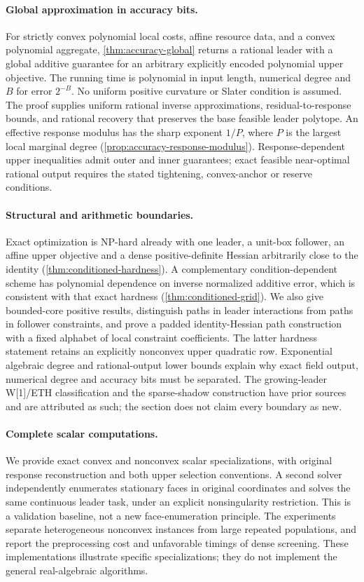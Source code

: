 \paragraph{Global approximation in accuracy bits.}
For strictly convex polynomial local costs, affine resource data, and a convex
polynomial aggregate, \cref{thm:accuracy-global} returns a rational leader
with a global additive guarantee for an arbitrary explicitly encoded polynomial
upper objective. The running time is polynomial in input length, numerical
degree and $B$ for error $2^{-B}$. No uniform positive curvature or Slater
condition is assumed. The proof supplies uniform rational inverse
approximations, residual-to-response bounds, and rational recovery that
preserves the base feasible leader polytope. An effective response modulus has
the sharp exponent $1/P$, where $P$ is the largest local marginal degree
(\cref{prop:accuracy-response-modulus}). Response-dependent upper inequalities
admit outer and inner guarantees; exact feasible near-optimal rational output
requires the stated tightening, convex-anchor or reserve conditions.

\paragraph{Structural and arithmetic boundaries.}
Exact optimization is NP-hard already with one leader, a unit-box follower,
an affine upper objective and a dense positive-definite Hessian arbitrarily
close to the identity (\cref{thm:conditioned-hardness}). A complementary
condition-dependent scheme has polynomial dependence on inverse normalized
additive error, which is consistent with that exact hardness
(\cref{thm:conditioned-grid}). We also give bounded-core positive results,
distinguish paths in leader interactions from paths in follower constraints,
and prove a padded identity-Hessian path construction with a fixed alphabet
of local constraint coefficients. The latter hardness statement retains an
explicitly nonconvex upper quadratic row. Exponential algebraic degree and
rational-output lower bounds explain why exact field output, numerical degree
and accuracy bits must be separated. The growing-leader W[1]/ETH
classification and the sparse-shadow construction have prior sources and are
attributed as such; the section does not claim every boundary as new.

\paragraph{Complete scalar computations.}
We provide exact convex and nonconvex scalar specializations, with original
response reconstruction and both upper selection conventions. A second solver
independently enumerates stationary faces in original coordinates and solves
the same continuous leader task, under an explicit nonsingularity restriction.
This is a validation baseline, not a new face-enumeration principle.
The experiments separate heterogeneous nonconvex instances from large repeated
populations, and report the preprocessing cost and unfavorable timings of
dense screening. These implementations illustrate specific specializations;
they do not implement the general real-algebraic algorithms.

